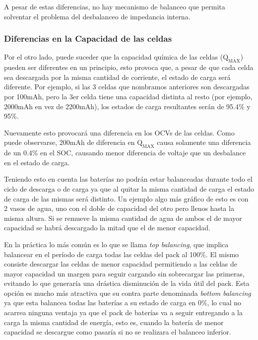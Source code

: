 \documentclass[10pt,a4paper]{article}
\begin{document}
A pesar de estas diferencias, no hay mecanismo de balanceo que permita solventar
el problema del desbalanceo de impedancia interna.

\subsubsection{Diferencias en la Capacidad de las celdas}

Por el otro lado, puede suceder que la capacidad química de las celdas
($\mathrm{Q_{MAX}}$) pueden ser diferentes en un principio, esto provoca que, a
pesar de que cada celda sea descargada por la misma cantidad de corriente, el
estado de carga será diferente. Por ejemplo, si las 3 celdas que nombramos
anteriores son descargadas por 100mAh, pero la 3er celda tiene una capacidad
distinta al resto (por ejemplo, 2000mAh en vez de 2200mAh), los estados de carga
resultantes serán de 95.4\% y 95\%.

Nuevamente esto provocará una diferencia en los OCVs de las celdas. Como puede
observarse, 200mAh de diferencia en $\mathrm{Q_{MAX}}$ causa solamente una
diferencia de un 0.4\% en el SOC, causando menor diferencia de voltaje que un
desbalance en el estado de carga.

Teniendo esto en cuenta las baterías no podrán estar balanceadas durante todo el
ciclo de descarga o de carga ya que al quitar la misma cantidad de carga el
estado de carga de las mismas será distinto. Un ejemplo algo más gráfico de esto
es con 2 vasos de agua, uno con el doble de capacidad del otro pero llenos hasta
la misma altura. Si se remueve la misma cantidad de agua de ambos el de mayor
capacidad se habrá descargado la mitad que el de menor capacidad.

En la práctica lo más común es lo que se llama \emph{top balancing}, que implica
balancear en el período de carga todas las celdas del pack al 100\%. El mismo
consiste descargar las celdas de menor capacidad permitiendo a las celdas de
mayor capacidad un margen para seguir cargando sin sobrecargar las primeras,
evitando lo que generaría una drástica disminución de la vida útil del pack.
Esta opción es mucho más atractiva que su contra parte denominada \emph{bottom
balancing} ya que esta balancea todas las baterías a su estado de carga en 0\%,
lo cual no acarrea ninguna ventaja ya que el pack de baterías va a seguir
entregando a la carga la misma cantidad de energía, esto es, cuando la batería
de menor capacidad se descargue como pasaría si no se realizara el balanceo
inferior.
\end{document}
